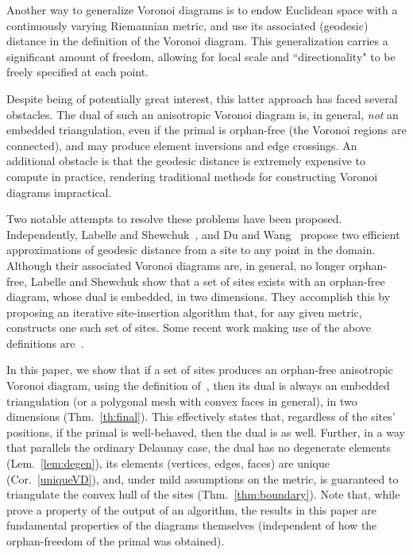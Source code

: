 \documentclass[11pt]{article}
\begin{document}
Another way to generalize Voronoi diagrams is to endow Euclidean space with a
continuously varying Riemannian metric, and use its associated (geodesic) distance 
in the definition of the Voronoi diagram. 
This generalization carries a significant
amount of freedom, allowing for local scale and ``directionality" to be freely
specified at each point. 


Despite being of potentially great interest, this latter approach has faced several
obstacles. 
The dual of such an anisotropic Voronoi diagram is, in general, 
\emph{not} an embedded triangulation, even if the primal is orphan-free (the Voronoi regions are connected), 
and may produce element inversions and edge crossings. 
An additional obstacle is that the geodesic distance is extremely expensive to compute in practice, rendering traditional methods
for constructing Voronoi diagrams impractical. 

Two notable attempts to resolve these problems have been proposed. 
Independently, Labelle and Shewchuk~\cite{LS}, and Du and Wang~\cite{DW} propose
two efficient approximations of geodesic distance from a site to any point in the
domain. 
Although their associated Voronoi diagrams are, in general, no longer orphan-free, 
Labelle and Shewchuk show that a set of sites exists with an orphan-free diagram, whose dual is embedded, in two dimensions. They accomplish this by proposing an iterative site-insertion algorithm
that, for any given metric, constructs one such set of sites. 
Some recent work making use of the above definitions are~\cite{Boissonnat:2008:LUA:1377676.1377724,BOISSONNAT-2007-488446}.


In this paper, we show that if a set of sites produces an orphan-free 
anisotropic Voronoi diagram, using the definition of~\cite{DW}, 
then its dual is always an embedded triangulation (or a polygonal mesh with convex faces in general), in two dimensions (Thm.~\ref{th:final}). 
This effectively states that, regardless of the sites' positions, if the primal is well-behaved, then the
dual is as well. 
Further, in a way that parallels the ordinary Delaunay case, the dual has no
degenerate elements (Lem.~\ref{lem:degen}), its elements (vertices, edges, faces) are unique (Cor.~\ref{uniqueVD}), and, under mild assumptions on the metric, is guaranteed to triangulate the convex hull of the sites (Thm.~\ref{thm:boundary}). 
Note that, while~\cite{LS} prove a property of the output of an algorithm, the results in this paper are fundamental properties of the diagrams themselves 
(independent of how the orphan-freedom of the primal was obtained).
\end{document}
